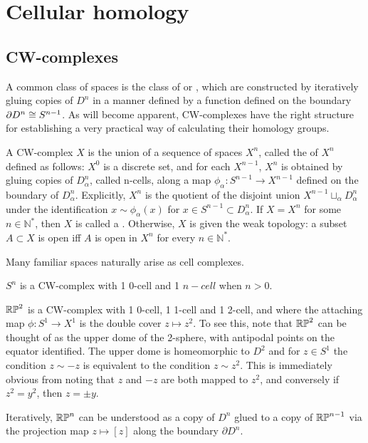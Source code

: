 \section{Cellular homology}\label{sec-cellular-homology}
\subsection{CW-complexes}
A common class of spaces is the class of  or , which are constructed by iteratively gluing copies of $D^n$ in a manner defined by a function defined on the boundary $\partial D^n \cong S^{n-1}$. As will become apparent, CW-complexes have the right structure for establishing a very practical way of calculating their homology groups.

\begin{definition}
A CW-complex $X$ is the union of a sequence of spaces $X^n$, called the  of $X^n$ defined as follows: $X^0$ is a discrete set, and for each $X^{n-1}$, $X^{n}$ is obtained by gluing copies of $D_{\alpha}^n$, called n-cells, along a map $\phi_{\alpha}:S^{n-1}\rightarrow X^{n-1}$ defined on the boundary of $D_{\alpha}^n$. Explicitly, $X^n$ is the quotient of the disjoint union $X^{n-1}\sqcup_{\alpha} D_{\alpha}^n$ under the identification $x\sim \phi_{\alpha}(x)$ for $x\in S^{n-1}\subset D_{\alpha}^n$. If $X=X^n$ for some $n\in \mathbb{N}^*$, then $X$ is called a . Otherwise, $X$ is given the weak topology: a subset $A\subset X$ is open iff $A$ is open in $X^n$ for every $n\in \mathbb{N}^*$.
\end{definition}

Many familiar spaces naturally arise as cell complexes.

\begin{example}
$S^{n}$ is a CW-complex with 1 0-cell and 1 $n-cell$ when $n>0$. 
\end{example}

\begin{example}
$\mathbb{RP}^{2}$ is a CW-complex with 1 0-cell, 1 1-cell and 1 2-cell, and where the attaching map $\phi:S^1\rightarrow X^1$ is the double cover $z\mapsto z^2$. To see this, note that $\mathbb{RP}^{2}$ can be thought of as the upper dome of the 2-sphere, with antipodal points on the equator identified. The upper dome is homeomorphic to $D^2$ and for $z\in S^{1}$ the condition $z\sim -z$ is equivalent to the condition $z\sim z^2$. This is immediately obvious from noting that $z$ and $-z$ are both mapped to $z^2$, and conversely if $z^2=y^2$, then $z=\pm y$.

Iteratively, $\mathbb{RP}^{n}$ can be understood as a copy of $D^n$ glued to a copy of $\mathbb{RP}^{n-1}$ via the projection map $z\mapsto [z]$ along the boundary $\partial D^n$.
\end{example}

